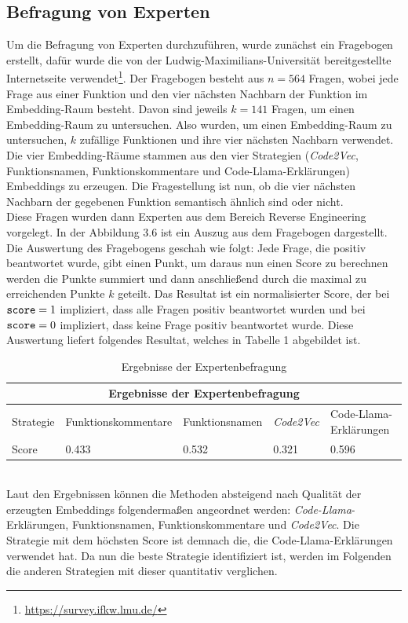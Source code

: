 \documentclass[12pt,letterpaper,ngerman]{article}
\begin{document}
\subsection{Befragung von Experten}
Um die Befragung von Experten durchzuführen, wurde zunächst ein
Fragebogen erstellt, dafür wurde die von der 
Ludwig-Maximilians-Universität bereitgestellte Internetseite
verwendet\footnote{\url{https://survey.ifkw.lmu.de/}}. Der 
Fragebogen besteht aus $n=564 $ Fragen, wobei jede Frage aus
einer Funktion und den vier nächsten Nachbarn der Funktion im
Embedding-Raum besteht. Davon sind jeweils $k = 141$ Fragen, um
einen Embedding-Raum zu untersuchen. Also wurden, um einen
Embedding-Raum zu untersuchen, $k$ zufällige Funktionen und ihre
vier nächsten Nachbarn verwendet. Die vier Embedding-Räume
stammen aus den vier Strategien (\textit{Code2Vec}, Funktionsnamen,
Funktionskommentare und Code-Llama-Erklärungen) Embeddings zu 
erzeugen. Die Fragestellung ist nun, ob die vier nächsten Nachbarn 
der gegebenen Funktion semantisch ähnlich sind oder nicht.\\
Diese Fragen wurden dann Experten aus dem Bereich Reverse Engineering
vorgelegt. In der Abbildung 3.6 ist ein Auszug aus dem Fragebogen dargestellt.\\
Die Auswertung des Fragebogens geschah wie folgt: Jede Frage,
die positiv beantwortet wurde, gibt einen Punkt, um daraus nun 
einen Score zu berechnen werden die Punkte
summiert und dann anschließend durch die  maximal zu
erreichenden Punkte $k$ geteilt. Das Resultat ist ein normalisierter 
Score, der bei $\verb|score| = 1$ impliziert, dass alle Fragen 
positiv beantwortet wurden und bei $\verb|score| = 0$ impliziert, 
dass keine Frage positiv beantwortet wurde. Diese 
Auswertung liefert folgendes Resultat, welches in Tabelle 1
abgebildet ist.
\begin{table}
  \begin{center}
    \begin{tabular}{ |p{1.3cm}||p{3.8cm}|p{3cm}|p{1.8cm}|p{4.5cm}|  }
    \hline
    \multicolumn{5}{|c|}{Ergebnisse der Expertenbefragung} \\
    \hline
    Strategie & Funktionskommentare &  Funktionsnamen & \textit{Code2Vec} & Code-Llama-Erklärungen\\
    \hline
    Score   & 0.433 & 0.532 & 0.321 & 0.596 \\
    \hline
    \end{tabular}
  \end{center} 
  \caption{Ergebnisse der Expertenbefragung}
\end{table}
\hfill\\
Laut den Ergebnissen können die Methoden absteigend 
nach Qualität der erzeugten Embeddings folgendermaßen
angeordnet werden: \textit{Code-Llama}-Erklärungen, 
Funktionsnamen, Funktionskommentare und \textit{Code2Vec}.
Die Strategie mit dem höchsten Score ist demnach die,
die Code-Llama-Erklärungen
verwendet hat. Da nun die beste Strategie identifiziert ist, 
werden im Folgenden die anderen Strategien mit dieser quantitativ verglichen.
\pagebreak
\end{document}
